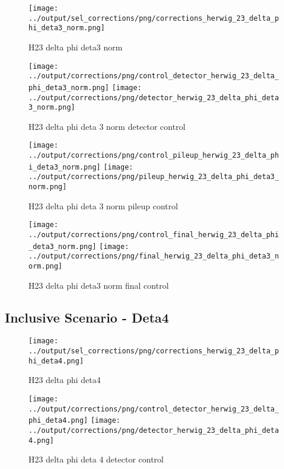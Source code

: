 \documentclass[11pt]{book}
\begin{document}
\begin{figure}[ht]
\centering
\texttt{[image: ../output/sel\_corrections/png/corrections\_herwig\_23\_delta\_phi\_deta3\_norm.png]}
\caption{H23 delta phi deta3 norm}
\label{fig:H23_delta_phi_deta3_norm}
\end{figure}

\begin{figure}[ht]
\centering
\texttt{[image: ../output/corrections/png/control\_detector\_herwig\_23\_delta\_phi\_deta3\_norm.png]}
\texttt{[image: ../output/corrections/png/detector\_herwig\_23\_delta\_phi\_deta3\_norm.png]}
\caption{H23 delta phi deta 3 norm detector control}
\label{fig:H23_delta_phi_deta3_norm_detector_control}
\end{figure}

\begin{figure}[ht]
\centering
\texttt{[image: ../output/corrections/png/control\_pileup\_herwig\_23\_delta\_phi\_deta3\_norm.png]}
\texttt{[image: ../output/corrections/png/pileup\_herwig\_23\_delta\_phi\_deta3\_norm.png]}
\caption{H23 delta phi deta 3 norm pileup control}
\label{fig:H23_delta_phi_deta3_norm_pileup_control}
\end{figure}


\begin{figure}[ht]
\centering
\texttt{[image: ../output/corrections/png/control\_final\_herwig\_23\_delta\_phi\_deta3\_norm.png]}
\texttt{[image: ../output/corrections/png/final\_herwig\_23\_delta\_phi\_deta3\_norm.png]}
\caption{H23 delta phi deta3 norm final control}
\label{fig:H23_delta_phi_deta3_norm_final_control}
\end{figure}


\clearpage
\subsection{Inclusive Scenario - Deta4}
\begin{figure}[ht]
\centering
\texttt{[image: ../output/sel\_corrections/png/corrections\_herwig\_23\_delta\_phi\_deta4.png]}
\caption{H23 delta phi deta4}
\label{fig:H23_delta_phi_deta4}
\end{figure}


\begin{figure}[ht]
\centering
\texttt{[image: ../output/corrections/png/control\_detector\_herwig\_23\_delta\_phi\_deta4.png]}
\texttt{[image: ../output/corrections/png/detector\_herwig\_23\_delta\_phi\_deta4.png]}
\caption{H23 delta phi deta 4 detector control}
\label{fig:H23_delta_phi_deta4_detector_control}
\end{figure}
\end{document}

